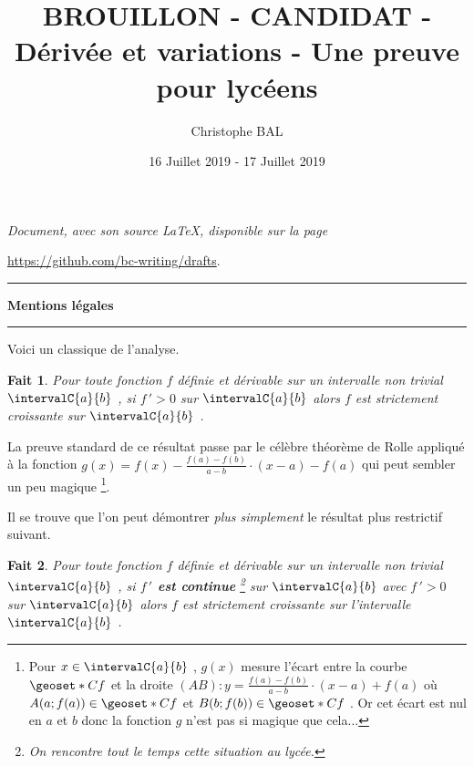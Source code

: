 \documentclass[12pt]{amsart}
\newtheorem{fact}{Fait}
\begin{document}
\title{BROUILLON - CANDIDAT - Dérivée et variations - Une preuve pour lycéens}
\author{Christophe BAL}
\date{16 Juillet 2019 - 17 Juillet 2019}

\maketitle

\begin{center}
	\itshape
	Document, avec son source \LaTeX, disponible sur la page
	
	\url{https://github.com/bc-writing/drafts}.
\end{center}


\bigskip


\begin{center}
	\hrule\vspace{.3em}
	{
		\fontsize{1.35em}{1em}\selectfont
		\textbf{Mentions \og légales \fg}
	}
			
	\vspace{0.45em}
	\doclicenseThis
	\hrule
\end{center}


\vspace{1em}


Voici un classique de l'analyse.


\begin{fact}
	Pour toute fonction $f$ définie et dérivable sur un intervalle non trivial $\intervalC{a}{b}$ , si $f\,' > 0$ sur $\intervalC{a}{b}$ alors $f$ est strictement croissante sur $\intervalC{a}{b}$ .
\end{fact}

La preuve standard de ce résultat passe par le célèbre théorème de Rolle appliqué à la fonction $g(x) = f(x) - \frac{f(a) - f(b)}{a - b} \cdot (x - a) - f(a)$ qui peut sembler un peu magique
\footnote{
	Pour $x \in \intervalC{a}{b}$ , $g(x)$ mesure l'écart entre la courbe $\geoset*{C}{f}$ et la droite $(AB) : y = \frac{f(a) - f(b)}{a - b} \cdot (x - a) + f(a)$ où $A(a ; f(a)) \in \geoset*{C}{f}$ et $B(b ; f(b)) \in \geoset*{C}{f}$ .
	Or cet écart est nul en $a$ et $b$ donc la fonction $g$ n'est pas si magique que cela...
}.


\bigskip


Il se trouve que l'on peut démontrer \emph{\og plus simplement \fg} le résultat plus restrictif suivant.


\begin{fact}
	Pour toute fonction $f$ définie et dérivable sur un intervalle non trivial $\intervalC{a}{b}$ ,
	si \textbf{$f\,'$ est continue} 
	\footnote{
		On rencontre tout le temps cette situation au lycée.
	} 
	sur $\intervalC{a}{b}$ avec $f\,' > 0$ sur $\intervalC{a}{b}$
	alors $f$ est strictement croissante sur l'intervalle $\intervalC{a}{b}$ .
\end{fact}
\end{document}
